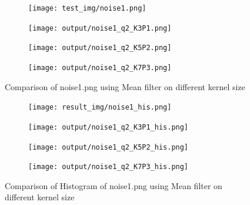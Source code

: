 \documentclass[12pt,a4paper]{report}
\begin{document}
\begin{figure}[!htb]
  \begin{minipage}{\linewidth}
    \centering
    \begin{subfigure}{0.49\textwidth}
      \texttt{[image: test\_img/noise1.png]}
    \end{subfigure}
    \begin{subfigure}{0.49\textwidth}
      \texttt{[image: output/noise1\_q2\_K3P1.png]}
    \end{subfigure}

    \begin{subfigure}{0.49\textwidth}
      \texttt{[image: output/noise1\_q2\_K5P2.png]}
    \end{subfigure}
    \begin{subfigure}{0.49\textwidth}
      \texttt{[image: output/noise1\_q2\_K7P3.png]}
    \end{subfigure}

  \caption{Comparison of noise1.png using Mean filter on different kernel size}
  \end{minipage}

\end{figure}
\begin{figure}[!htb]
  \begin{minipage}{\linewidth}
    \centering
    \begin{subfigure}{1\textwidth}
      \texttt{[image: result\_img/noise1\_his.png]}
    \end{subfigure}
    \begin{subfigure}{1\textwidth}
      \texttt{[image: output/noise1\_q2\_K3P1\_his.png]}
    \end{subfigure}

    \begin{subfigure}{1\textwidth}
      \texttt{[image: output/noise1\_q2\_K5P2\_his.png]}
    \end{subfigure}
    \begin{subfigure}{1\textwidth}
      \texttt{[image: output/noise1\_q2\_K7P3\_his.png]}
    \end{subfigure}
    
  \caption{Comparison of Histogram of noise1.png using Mean filter on different kernel size}
\label{fig:n1-median-hist}
\end{minipage}
\end{figure}
\end{document}
